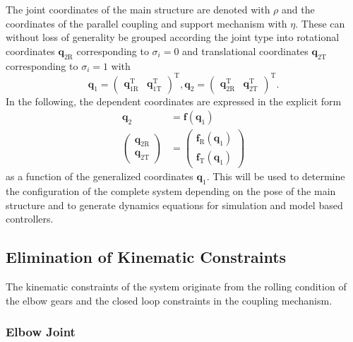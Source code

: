 \documentclass[letterpaper, 10 pt, conference]{ieeeconf}  %
\begin{document}
The joint coordinates of the main structure are denoted with $\rho$ and the coordinates of the parallel coupling and support mechanism with $\eta$.
%
%
These can without loss of generality be grouped according the joint type into rotational coordinates $\bm{q}_{2\mathrm{R}}$ corresponding to $\sigma_i=0$ and translational coordinates $\bm{q}_{2\mathrm{T}}$ corresponding to $\sigma_i=1$ with
%
\begin{equation}
\bm{q}_1=\begin{pmatrix}\bm{q}_{1\mathrm{R}}^\mathrm{T} & \bm{q}_{1\mathrm{T}}^\mathrm{T} \end{pmatrix}^\mathrm{T},
\bm{q}_2=\begin{pmatrix}\bm{q}_{2\mathrm{R}}^\mathrm{T} & \bm{q}_{2\mathrm{T}}^\mathrm{T} \end{pmatrix}^\mathrm{T}.
\end{equation}
%
In the following, the dependent coordinates are expressed in the explicit form
%
\begin{align}
\bm{q}_2 &= \bm{f}(\bm{q}_1) \label{equ:kinconstr_explicit} \\
\begin{pmatrix}\bm{q}_{2\mathrm{R}}\\\bm{q}_{2\mathrm{T}}\end{pmatrix} &= \begin{pmatrix}\bm{f}_{\mathrm{R}}(\bm{q}_1)\\\bm{f}_{\mathrm{T}}(\bm{q}_1)\end{pmatrix}
\end{align}
%
as a function of the generalized coordinates $\bm{q}_1$.
This will be used to determine the configuration of the complete system depending on the pose of the main structure and to generate dynamics equations for simulation and model based controllers.

\subsection{Elimination of Kinematic Constraints}

The kinematic constraints of the system originate from the rolling condition of the elbow gears and the closed loop constraints in the coupling mechanism.

\subsubsection{Elbow Joint}
\end{document}

